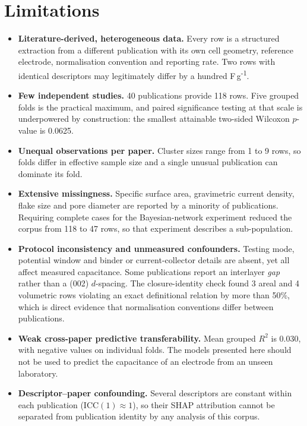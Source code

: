 \section{Limitations}\label{sec:limitations}

\begin{itemize}
\item \textbf{Literature-derived, heterogeneous data.} Every row is a structured extraction
from a different publication with its own cell geometry, reference electrode, normalisation
convention and reporting rate. Two rows with identical descriptors may legitimately differ by
a hundred F\,g\textsuperscript{-1}.

\item \textbf{Few independent studies.} 40 publications provide 118 rows. Five grouped
folds is the practical maximum, and paired significance testing at that scale is underpowered
by construction: the smallest attainable two-sided Wilcoxon $p$-value is 0.0625.

\item \textbf{Unequal observations per paper.} Cluster sizes range from 1 to 9 rows, so
folds differ in effective sample size and a single unusual publication can dominate its fold.

\item \textbf{Extensive missingness.} Specific surface area, gravimetric current density,
flake size and pore diameter are reported by a minority of publications. Requiring complete
cases for the Bayesian-network experiment reduced the corpus from 118 to
47 rows, so that experiment describes a sub-population.

\item \textbf{Protocol inconsistency and unmeasured confounders.} Testing mode, potential
window and binder or current-collector details are absent, yet all affect measured
capacitance. Some publications report an interlayer \emph{gap} rather than a (002)
$d$-spacing. The closure-identity check found
3 areal and 4
volumetric rows violating an exact definitional relation by more than 50\%, which is direct
evidence that normalisation conventions differ between publications.

\item \textbf{Weak cross-paper predictive transferability.} Mean grouped $R^2$ is
0.030, with negative values on individual folds. The models presented here
should not be used to predict the capacitance of an electrode from an unseen laboratory.

\item \textbf{Descriptor--paper confounding.} Several descriptors are constant within each
publication (ICC$(1) \approx 1$), so their SHAP attribution cannot be separated from
publication identity by any analysis of this corpus.


\end{itemize}
